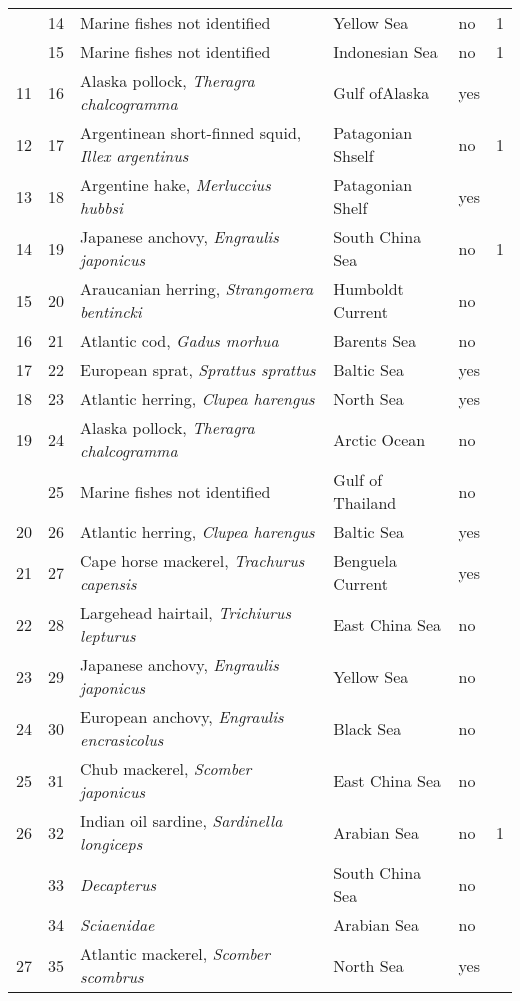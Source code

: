 \begin{longtable}{p{2cm} | p{2cm} | p{5cm} | l | p{2cm} | p{2cm}}
 & 14& Marine fishes not identified & Yellow Sea & no & 1\\
 & 15& Marine fishes not identified & Indonesian Sea & no & 1\\ \hline
11 & 16& Alaska pollock, \textit{Theragra chalcogramma} & Gulf ofAlaska & yes & \\ \hline
12 & 17& Argentinean short-finned squid, \textit{Illex argentinus} & Patagonian Shself & no & 1\\ \hline
13 & 18& Argentine hake, \textit{Merluccius hubbsi} & Patagonian Shelf & yes & \\ \hline
14 & 19& Japanese anchovy, \textit{Engraulis japonicus} & South China Sea & no & 1\\ \hline
15 & 20& Araucanian herring, \textit{Strangomera bentincki} & Humboldt Current & no & \\ \hline
16 & 21& Atlantic cod, \textit{Gadus morhua} & Barents Sea & no & \\ \hline
17 & 22& European sprat, \textit{Sprattus sprattus} & Baltic Sea & yes & \\ \hline
18 & 23& Atlantic herring, \textit{Clupea harengus} & North Sea & yes & \\ \hline
19 & 24& Alaska pollock, \textit{Theragra chalcogramma} & Arctic Ocean & no & \\ \hline
 & 25& Marine fishes not identified & Gulf of Thailand & no & \\
20 & 26& Atlantic herring, \textit{Clupea harengus} & Baltic Sea & yes & \\ \hline
21 & 27& Cape horse mackerel, \textit{Trachurus capensis} & Benguela Current & yes & \\ \hline
22 & 28& Largehead hairtail, \textit{Trichiurus lepturus} & East China Sea & no & \\ \hline
23 & 29& Japanese anchovy, \textit{Engraulis japonicus} & Yellow Sea & no & \\ \hline
24 & 30& European anchovy, \textit{Engraulis encrasicolus} & Black Sea & no & \\ \hline
25 & 31& Chub mackerel, \textit{Scomber japonicus} & East China Sea & no & \\ \hline
26 & 32& Indian oil sardine, \textit{Sardinella longiceps} & Arabian Sea & no & 1\\ \hline
 & 33& \textit{Decapterus} & South China Sea & no & \\
 & 34& \textit{Sciaenidae} & Arabian Sea & no & \\
27 & 35& Atlantic mackerel, \textit{Scomber scombrus} & North Sea & yes & \\ \hline

\end{longtable}
